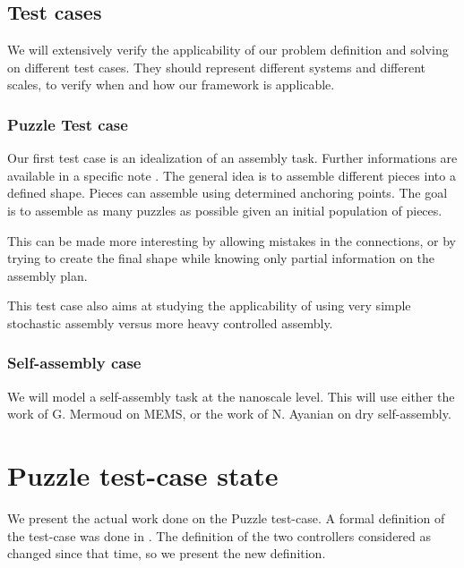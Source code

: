 \documentclass[letterpaper, oneside]{article}
\begin{document}

\subsection{Test cases} %
\label{sub:test_cases}

We will extensively verify the applicability of our problem definition and solving on different test cases. They should represent different systems and different scales, to verify when and how our framework is applicable.
\subsubsection{Puzzle Test case} %
\label{ssub:puzzle_test_case}
Our first test case is an idealization of an assembly task. Further informations are available in a specific note \cite{Matthey:2008rm}. The general idea is to assemble different pieces into a defined shape. Pieces can assemble using determined anchoring points. The goal is to assemble as many puzzles as possible given an initial population of pieces.

This can be made more interesting by allowing mistakes in the connections, or by trying to create the final shape while knowing only partial information on the assembly plan.

This test case also aims at studying the applicability of using very simple stochastic assembly versus more heavy controlled assembly.

\subsubsection{Self-assembly case} %
\label{ssub:self_assembly_case}
We will model a self-assembly task at the nanoscale level. This will use either the work of G. Mermoud on MEMS, or the work of N. Ayanian on dry self-assembly.



\section{Puzzle test-case state} %
\label{sec:puzzle_test_case_state}

We present the actual work done on the Puzzle test-case. A formal definition of the test-case was done in \cite{Matthey:2008rm}. The definition of the two controllers considered as changed since that time, so we present the new definition.
\end{document}
